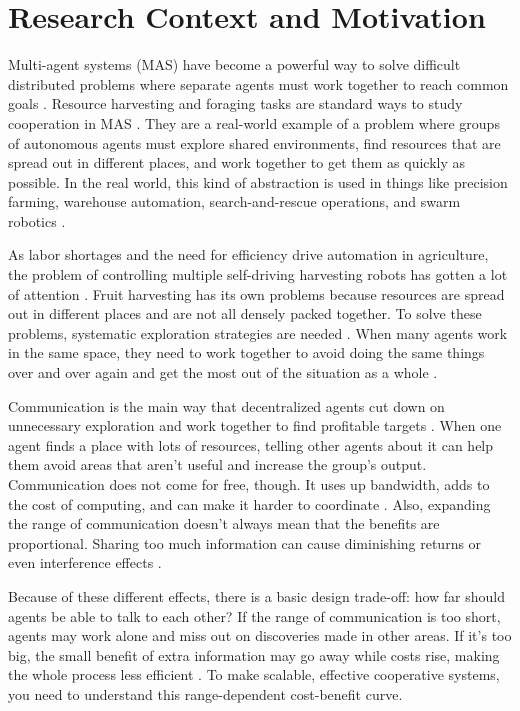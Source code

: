 
\section{Research Context and Motivation}

Multi-agent systems (MAS) have become a powerful way to solve difficult distributed problems where separate agents must work together to reach common goals \citep{wooldridge2009introduction, shoham2008multiagent}. Resource harvesting and foraging tasks are standard ways to study cooperation in MAS \citep{zedadra2017, liu2007modeling}. They are a real-world example of a problem where groups of autonomous agents must explore shared environments, find resources that are spread out in different places, and work together to get them as quickly as possible. In the real world, this kind of abstraction is used in things like precision farming, warehouse automation, search-and-rescue operations, and swarm robotics \citep{brambilla2013swarm, bechar2016agricultural}.

As labor shortages and the need for efficiency drive automation in agriculture, the problem of controlling multiple self-driving harvesting robots has gotten a lot of attention \citep{fountas2020agricultural}. Fruit harvesting has its own problems because resources are spread out in different places and are not all densely packed together. To solve these problems, systematic exploration strategies are needed \citep{shell2006coordination}. When many agents work in the same space, they need to work together to avoid doing the same things over and over again and get the most out of the situation as a whole \citep{cao1997cooperative}.

Communication is the main way that decentralized agents cut down on unnecessary exploration and work together to find profitable targets \citep{panait2005cooperative, yan2013survey}. When one agent finds a place with lots of resources, telling other agents about it can help them avoid areas that aren't useful and increase the group's output. Communication does not come for free, though. It uses up bandwidth, adds to the cost of computing, and can make it harder to coordinate \citep{farinelli2004multirobot}. Also, expanding the range of communication doesn't always mean that the benefits are proportional. Sharing too much information can cause diminishing returns or even interference effects \citep{zhang2024}.

Because of these different effects, there is a basic design trade-off: {how far should agents be able to talk to each other?} If the range of communication is too short, agents may work alone and miss out on discoveries made in other areas. If it's too big, the small benefit of extra information may go away while costs rise, making the whole process less efficient \citep{parker2008multiple}. To make scalable, effective cooperative systems, you need to understand this range-dependent cost-benefit curve.

